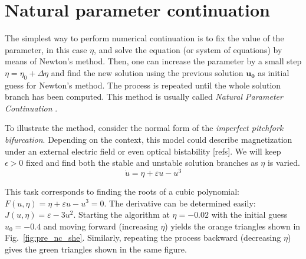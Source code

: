 \section{Natural parameter continuation}

The simplest way to perform numerical continuation is to fix the value 
of the parameter, in this case $\eta$, and solve the equation (or system of 
equations) by means of Newton's method. Then, one can increase the parameter 
by a small step $\eta = \eta_0 + \Delta \eta$ and find the new solution using 
the previous solution $\bm{u_0}$ as initial guess for Newton's method. 
The process is repeated until the whole solution branch has been 
computed. This method is usually called {\em Natural Parameter Continuation}
\cite{doedel2007lecture}.

\begin{exmp}
    To illustrate the method, consider the normal form of the {\em imperfect pitchfork
    bifurcation}. Depending on the context, this model could describe magnetization
    under an external electric field or even optical bistability [refs]. We will 
    keep $\epsilon > 0$ fixed and
    find both the stable and unstable solution branches as $\eta$ is varied.
\begin{equation}
        \dot{u} = \eta + \varepsilon u - u^3
        \label{eq:pre_nc_she}
    \end{equation}

    This task corresponds to finding the roots of a cubic polynomial: $F(u, \eta) = \eta + \varepsilon u - u^3 = 0$. The derivative
    can be determined easily: $J(u, \eta) = \varepsilon - 3u^2$. Starting the algorithm
    at $\eta = -0.02$ with the initial guess $u_0=-0.4$ and moving forward (increasing $\eta$)
    yields the orange triangles shown in Fig.~\ref{fig:pre_nc_she}. Similarly, repeating
    the process backward (decreasing $\eta$) gives the green triangles shown in the same
    figure. 



\end{exmp}
